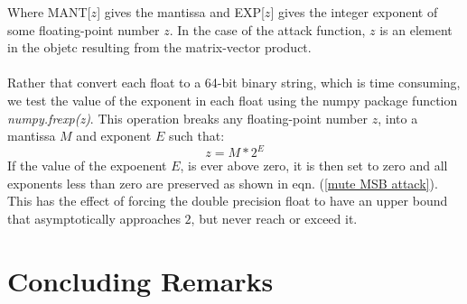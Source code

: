 \documentclass[12pt,letterpaper]{article}
\begin{document}
Where MANT[$z$] gives the mantissa and EXP[$z$] gives the integer exponent of some floating-point number $z$. In the case of the attack function, $z$ is an element in the objetc resulting from the matrix-vector product.

\paragraph*{}Rather that convert each float to a 64-bit binary string, which is time consuming, we test the value of the exponent in each float using the numpy package function \textit{numpy.frexp(z)}. This operation breaks any floating-point number $z$, into a mantissa $M$ and exponent $E$ such that:
\begin{equation}
z = M * 2^{E}
\end{equation}
If the value of the expoenent $E$, is ever above zero, it is then set to zero and all exponents less than zero are preserved as shown in eqn. (\ref{mute MSB attack}). This has the effect of forcing the double precision float to have an upper bound that asymptotically approaches $2$, but never reach or exceed it.


\section*{Concluding Remarks}


\end{document}
